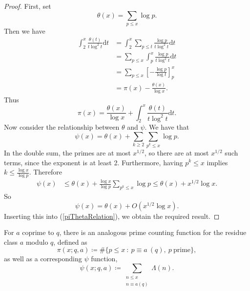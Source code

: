 \begin{proof}
First, set 
\begin{equation}
\theta(x) = \sum_{p \leq x} \log p. \nonumber
\end{equation}
Then we have
\begin{align}
\int_{2}^{x} \frac{\theta(t)}{t \log^{2} t} \mathrm{d} t &= \int_{2}^{x} \sum_{p \leq t} \frac{\log p}{t \log^{2} t} \mathrm{d} t \nonumber \\
&= \sum_{p \leq x} \int_{p}^{x}  \frac{\log p}{t \log^{2} t} \mathrm{d} t \nonumber \\
&= \sum_{p \leq x} \left[-\frac{\log p}{\log t} \right]_{p}^{x} \nonumber \\
&= \pi(x) - \frac{\theta(x)}{\log x}. \nonumber
\end{align}
Thus 
\begin{equation}
\label{piThetaRelation}
\pi(x) = \frac{\theta(x)}{\log x} + \int_{2}^{x} \frac{\theta(t)}{t \log^{2} t} \mathrm{d} t.
\end{equation}
Now consider the relationship between $\theta$ and $\psi$. We have that
\begin{equation}
\psi(x) = \theta(x) + \sum_{k \geq 2}\sum_{p^{k} \leq x} \log p. \nonumber
\end{equation}
In the double sum, the primes are at most $x^{1/2}$, so there are at most $x^{1/2}$ such terms, since the exponent is at least 2. Furthermore, having $p^{k} \leq x$ implies $k \leq \frac{\log x}{\log p}$. Therefore
\begin{align}
\psi(x) &\leq \theta(x) + \frac{\log x}{\log p} \sum_{p^{k} \leq x} \log p \leq \theta(x) + x^{1/2} \log x. \nonumber
\end{align}
So
\begin{equation}
\psi(x) = \theta(x) + O\left(x^{1/2} \log x \right). \nonumber
\end{equation}
Inserting this into (\ref{piThetaRelation}), we obtain the required result.
\end{proof}
For $a$ coprime to $q$, there is an analogous prime counting function for the residue class $a$ modulo $q$, defined as 
\begin{equation}
    \pi(x; q, a) \coloneqq \# \{p \leq x \ : \ p \equiv a \ (q), \ p \ \textrm{prime} \}, \nonumber
\end{equation}
as well as a corresponding $\psi$ function,
\begin{equation}
    \psi(x; q, a) \coloneqq \sum_{\substack{n \leq x \\ n \equiv a (q)}} \Lambda(n). \nonumber
\end{equation}
